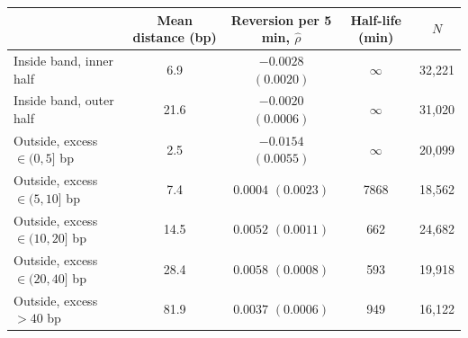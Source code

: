 \begin{tabular}{lcccc}
\toprule
 & Mean distance (bp) & Reversion per 5 min, $\hat\rho$ & Half-life (min) & $N$ \\
\midrule
Inside band, inner half & 6.9 & $-0.0028$ $(0.0020)$ & $\infty$ & 32,221 \\
Inside band, outer half & 21.6 & $-0.0020$ $(0.0006)$ & $\infty$ & 31,020 \\
Outside, excess $\in(0,5]$ bp & 2.5 & $-0.0154$ $(0.0055)$ & $\infty$ & 20,099 \\
Outside, excess $\in(5,10]$ bp & 7.4 & $0.0004$ $(0.0023)$ & 7868 & 18,562 \\
Outside, excess $\in(10,20]$ bp & 14.5 & $0.0052$ $(0.0011)$ & 662 & 24,682 \\
Outside, excess $\in(20,40]$ bp & 28.4 & $0.0058$ $(0.0008)$ & 593 & 19,918 \\
Outside, excess $>40$ bp & 81.9 & $0.0037$ $(0.0006)$ & 949 & 16,122 \\
\bottomrule
\end{tabular}
